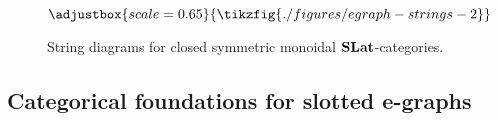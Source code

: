 

\begin{figure*}
	\[
		\adjustbox{scale=0.65}{
			\tikzfig{./figures/egraph-strings-2}
		}
	\]
	\captionsetup{skip=0pt, belowskip=-2ex}
	\caption{String diagrams for closed symmetric monoidal $\mathbf{SLat}$-categories.}
	\label{fig:egraph-strings}
\end{figure*}

\subsection{Categorical foundations for slotted e-graphs}

